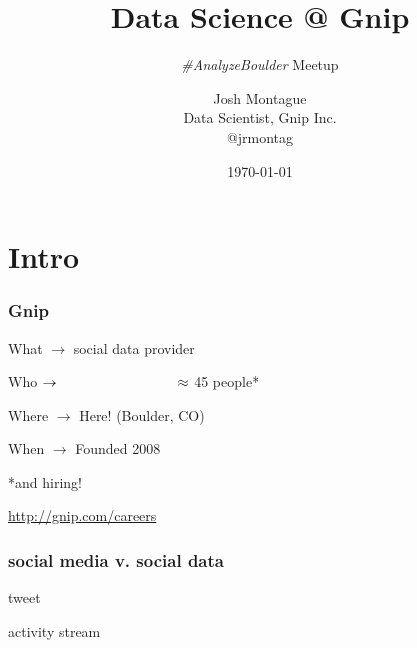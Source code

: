 \documentclass{beamer}
\title{Data Science @ Gnip }
\subtitle{\emph{\#AnalyzeBoulder} Meetup}
\author{Josh Montague\texorpdfstring{\\ Data Scientist, Gnip Inc. \\ @jrmontag}{}}
\date{\today}
\begin{document}
\begin{frame}
\titlepage
\end{frame}

\section{Intro}

\begin{frame} \frametitle{Gnip}

\vspace{0.2in}

\LARGE{What $\to$ \hspace{0.5in} social data provider}

\vspace{0.2in}

\LARGE{Who $\to  \hspace{1.2in} \approx$ 45 people* } 

\vspace{0.2in}

\LARGE{Where $\to$  \hspace{0.5in} Here! (Boulder, CO) }

\vspace{0.2in}

\LARGE{When $\to$ \hspace{0.75in} Founded 2008}

\vspace{0.4in}

{\hfill \large{*and hiring!}} 

{\hfill \normalsize\url{http://gnip.com/careers}}
\end{frame}


\begin{frame} \frametitle{social media v. social data}


\vspace{0.2in}

\LARGE{tweet}

\vspace{0.2in}

\LARGE{activity stream}

\end{frame}
\end{document}
